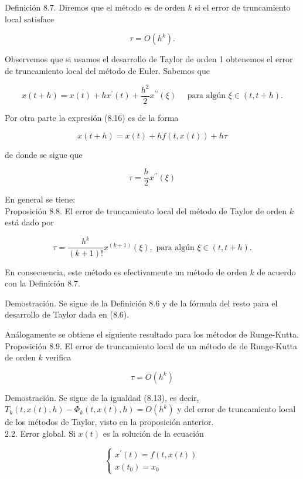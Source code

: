\documentclass[10pt]{book}
\begin{document}
Definición 8.7. Diremos que el método es de orden $k$ si el error de truncamiento local satisface

$$
\tau=O\left(h^{k}\right) .
$$

Observemos que si usamos el desarrollo de Taylor de orden 1 obtenemos el error de truncamiento local del método de Euler. Sabemos que

$$
x(t+h)=x(t)+h x^{\prime}(t)+\frac{h^{2}}{2} x^{\prime \prime}(\xi) \quad \text { para algún } \xi \in(t, t+h) .
$$

Por otra parte la expresión (8.16) es de la forma

$$
x(t+h)=x(t)+h f(t, x(t))+h \tau
$$

de donde se sigue que


\begin{equation*}
\tau=\frac{h}{2} x^{\prime \prime}(\xi) \tag{8.17}
\end{equation*}


En general se tiene:\\
Proposición 8.8. El error de truncamiento local del método de Taylor de orden $k$ está dado por


\begin{equation*}
\tau=\frac{h^{k}}{(k+1)!} x^{(k+1)}(\xi), \text { para algún } \xi \in(t, t+h) . \tag{8.18}
\end{equation*}


En consecuencia, este método es efectivamente un método de orden $k$ de acuerdo con la Definición 8.7.

Demostración. Se sigue de la Definición 8.6 y de la fórmula del resto para el desarrollo de Taylor dada en (8.6).

Análogamente se obtiene el siguiente resultado para los métodos de Runge-Kutta.\\
Proposición 8.9. El error de truncamiento local de un método de de Runge-Kutta de orden $k$ verifica

$$
\tau=O\left(h^{k}\right)
$$

Demostración. Se sigue de la igualdad (8.13), es decir, $T_{k}(t, x(t), h)-\Phi_{k}(t, x(t), h)=O\left(h^{k}\right)$ y del error de truncamiento local de los métodos de Taylor, visto en la proposición anterior.\\
2.2. Error global. Si $x(t)$ es la solución de la ecuación

$$
\left\{\begin{array}{l}
x^{\prime}(t)=f(t, x(t)) \\
x\left(t_{0}\right)=x_{0}
\end{array}\right.
$$
\end{document}
